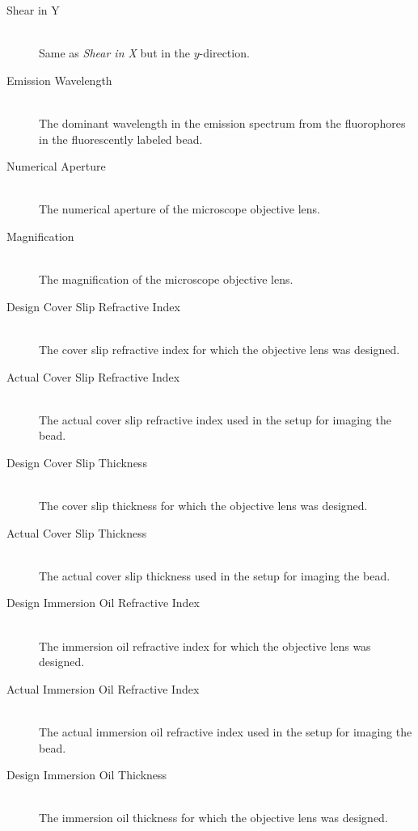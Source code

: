 \documentclass[11pt,titlepage,twoside]{article}
\begin{document}
\begin{description}
  \item[Shear in Y] \hfill \\
   Same as \emph{Shear in X} but in the $y$-direction.

  \item[Emission Wavelength] \hfill \\
   The dominant wavelength in the emission spectrum from the fluorophores in the fluorescently labeled bead.
  
  \item[Numerical Aperture] \hfill \\
   The numerical aperture of the microscope objective lens.
  
  \item[Magnification] \hfill \\
   The magnification of the microscope objective lens.

  \item[Design Cover Slip Refractive Index] \hfill \\
   The cover slip refractive index for which the objective lens was designed.
  
  \item[Actual Cover Slip Refractive Index] \hfill \\
   The actual cover slip refractive index used in the setup for imaging the bead.
  
  \item[Design Cover Slip Thickness] \hfill \\
   The cover slip thickness for which the objective lens was designed.
  
  \item[Actual Cover Slip Thickness] \hfill \\
   The actual cover slip thickness used in the setup for imaging the bead.
  
  \item[Design Immersion Oil Refractive Index] \hfill \\
   The immersion oil refractive index for which the objective lens was designed.
  
  \item[Actual Immersion Oil Refractive Index] \hfill \\
   The actual immersion oil refractive index used in the setup for imaging the bead.
  
  \item[Design Immersion Oil Thickness] \hfill \\
   The immersion oil thickness for which the objective lens was designed.
  

\end{description}
\end{document}
